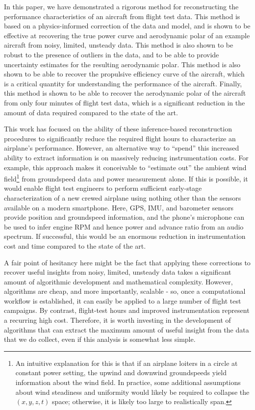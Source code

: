 \documentclass[conf]{new-aiaa}
\begin{document}
    In this paper, we have demonstrated a rigorous method for reconstructing the performance characteristics of an aircraft from flight test data. This method is based on a physics-informed correction of the data and model, and is shown to be effective at recovering the true power curve and aerodynamic polar of an example aircraft from noisy, limited, unsteady data. This method is also shown to be robust to the presence of outliers in the data, and to be able to provide uncertainty estimates for the resulting aerodynamic polar. This method is also shown to be able to recover the propulsive efficiency curve of the aircraft, which is a critical quantity for understanding the performance of the aircraft. Finally, this method is shown to be able to recover the aerodynamic polar of the aircraft from only four minutes of flight test data, which is a significant reduction in the amount of data required compared to the state of the art.

    This work has focused on the ability of these inference-based reconstruction procedures to significantly reduce the required flight hours to characterize an airplane's performance. However, an alternative way to ``spend'' this increased ability to extract information is on massively reducing instrumentation costs. For example, this approach makes it conceivable to ``estimate out'' the ambient wind field\footnote{An intuitive explanation for this is that if an airplane loiters in a circle at constant power setting, the upwind and downwind groundspeeds yield information about the wind field. In practice, some additional assumptions about wind steadiness and uniformity would likely be required to collapse the $(x, y, z, t)$ space; otherwise, it is likely too large to realistically span.} from groundspeed data and power measurement alone. If this is possible, it would enable flight test engineers to perform sufficient early-stage characterization of a new crewed airplane using nothing other than the sensors available on a modern smartphone. Here, GPS, IMU, and barometer sensors provide position and groundspeed information, and the phone's microphone can be used to infer engine RPM and hence power and advance ratio from an audio spectrum. If successful, this would be an enormous reduction in instrumentation cost and time compared to the state of the art.

    A fair point of hesitancy here might be the fact that applying these corrections to recover useful insights from noisy, limited, unsteady data takes a significant amount of algorithmic development and mathematical complexity. However, algorithms are cheap, and more importantly, scalable - so, once a computational workflow is established, it can easily be applied to a large number of flight test campaigns. By contrast, flight-test hours and improved instrumentation represent a recurring high cost. Therefore, it is worth investing in the development of algorithms that can extract the maximum amount of useful insight from the data that we do collect, even if this analysis is somewhat less simple.
\end{document}
